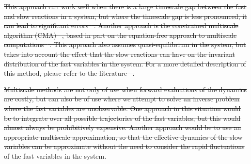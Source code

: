 \documentclass[final]{siamltex}
\providecommand{\DIFdel}[1]{{\protect\color{red}\sout{#1}}}                      %
\providecommand{\DIFdelbegin}{} %
\providecommand{\DIFdelend}{} %
\newcommand{\DIFscaledelfig}{0.5}
\newlength{\DIFdelgraphicswidth} %
\newlength{\DIFdelgraphicsheight} %
\newcommand{\DIFdelincludegraphics}[2][]{%
\sbox{\DIFdelgraphicsbox}{\DIFOincludegraphics[#1]{#2}}%
\settoboxwidth{\DIFdelgraphicswidth}{\DIFdelgraphicsbox} %
\settoboxtotalheight{\DIFdelgraphicsheight}{\DIFdelgraphicsbox} %
\scalebox{\DIFscaledelfig}{%
\parbox[b]{\DIFdelgraphicswidth}{\usebox{\DIFdelgraphicsbox}\\[-\baselineskip] \rule{\DIFdelgraphicswidth}{0em}}\llap{\resizebox{\DIFdelgraphicswidth}{\DIFdelgraphicsheight}{%
\setlength{\unitlength}{\DIFdelgraphicswidth}%
\begin{picture}(1,1)%
\thicklines\linethickness{2pt} %
{\color[rgb]{1,0,0}\put(0,0){\framebox(1,1){}}}%
{\color[rgb]{1,0,0}\put(0,0){\line( 1,1){1}}}%
{\color[rgb]{1,0,0}\put(0,1){\line(1,-1){1}}}%
\end{picture}%
}\hspace*{3pt}}} %
} %
\DeclareRobustCommand{\DIFdelbegin}{\DIFOdelbegin \let\includegraphics\DIFdelincludegraphics} %
\DeclareRobustCommand{\DIFdelend}{\DIFOaddend \let\includegraphics\DIFOincludegraphics} %
\begin{document}
\DIFdelbegin \DIFdel{This approach can work well when there is a large timescale gap
between the fast and slow reactions in a system, but where the
timescale gap is less pronounced, it can lead to significant
errors\mbox{%
\cite{cotter2016error}}\hspace{0pt}%
. Another approach is the
constrained multiscale algorithm (CMA)\mbox{%
\cite{cotter2011constrained,cotter2016constrained}}\hspace{0pt}%
, based in part on the
equation-free approach to multiscale computations\mbox{%
\cite{kevrekidis2003equation,erban2006gene}}\hspace{0pt}%
. This approach also assumes quasi-equilibrium in the
system, but takes into account the effect that the slow reactions can
have on the invariant distribution of the fast variables in the
system. For a more detailed description of this method, please refer
to the literature\mbox{%
\cite{cotter2016constrained}}\hspace{0pt}%
.
}\DIFdelend %



\DIFdelbegin \DIFdel{Multiscale methods are not only of use when forward evaluations of the
dynamics are costly, but can also be of use where we attempt to solve
an inverse problem where the fast variables are unobservable. One
approach in this situation would be to integrate over all possible
trajectories of the fast variables, but this would almost always be
prohibitively expensive. Another approach would be to use an
appropriate multiscale approximation, so that the effective dynamics
of the slow variables can be approximate without the need to consider
the rapid fluctuations of the fast variables in the system.
}\DIFdelend %
\end{document}
